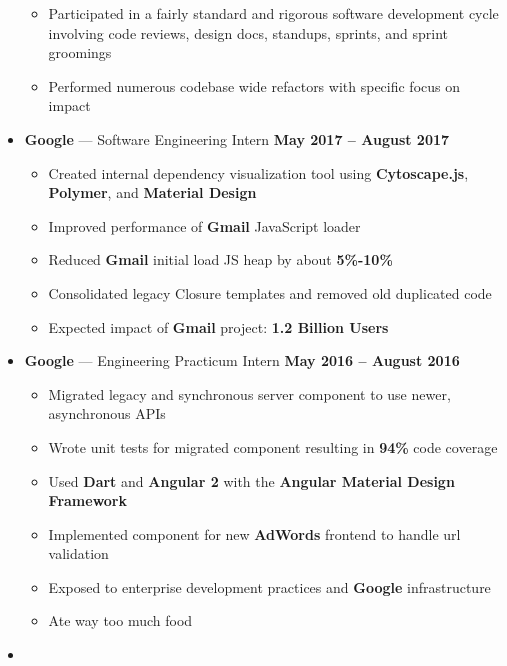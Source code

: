 \documentclass[10pt, oneside]{letter}
\newcommand{\textapprox}{\raisebox{0.5ex}{\texttildelow}}
\begin{document}
\begin{adjustwidth}{0.1in}{0pt}
\begin{itemize}
\begin{itemize}
              \item{
                Participated in a fairly standard and rigorous software development
                cycle involving code reviews, design docs, standups, sprints,
                and sprint groomings
              }

            \item{Performed numerous codebase wide refactors with specific focus on impact}
            \end{itemize}
        \item
          \textbf{Google} --- Software Engineering Intern \hfill \textbf{May 2017 -- August 2017}
            \begin{itemize}
              \item Created internal dependency visualization tool using \textbf{Cytoscape.js}, \textbf{Polymer}, and \textbf{Material Design}
              \item Improved performance of \textbf{Gmail} JavaScript loader
              \item Reduced \textbf{Gmail} initial load JS heap by about \textbf{5\%-10\%}
              \item Consolidated legacy Closure templates and removed old duplicated code
              \item Expected impact of \textbf{Gmail} project: \textbf{\textapprox 1.2 Billion Users}
            \end{itemize}
        \item
          \textbf{Google} --- Engineering Practicum Intern \hfill \textbf{May 2016 -- August 2016}
            \begin{itemize}
              \item Migrated legacy and synchronous server component to use newer, asynchronous APIs
              \item Wrote unit tests for migrated component resulting in \textbf{94\%} code coverage
              \item Used \textbf{Dart} and \textbf{Angular 2} with the \textbf{Angular Material Design Framework}
              \item Implemented component for new \textbf{AdWords} frontend to handle url validation
              \item Exposed to enterprise development practices and \textbf{Google} infrastructure
              \item Ate way too much food
            \end{itemize}
        \item

\end{itemize}
\end{adjustwidth}
\end{document}

